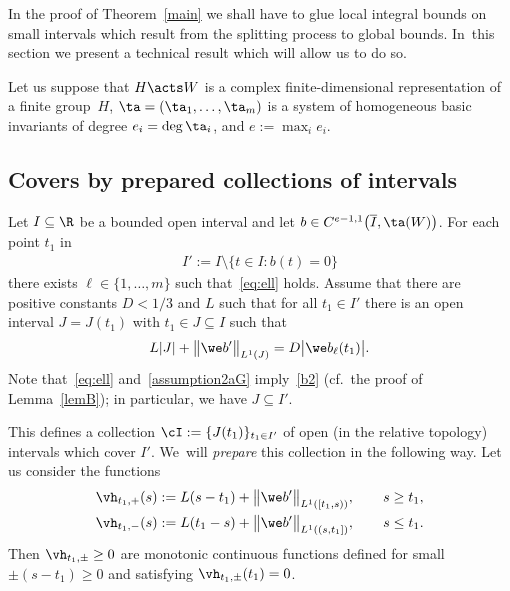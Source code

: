 In the proof of Theorem~\ref{main} we shall have to glue local integral bounds on small intervals which result from the splitting
process to global bounds. In~this section we present a technical result which will
allow us to do so.

Let us suppose that $H \acts W$ is a complex finite-dimensional representation of a finite group~$H$,
$\ta= (\ta_1,\dots, \ta_m)$ is a system of homogeneous basic invariants of degree $e_i = \deg \ta_i$, and
$e := \max_i e_i$.



\subsection{Covers by prepared collections of intervals}\label{sec:preparation}
Let $I \subseteq \R$ be a bounded open interval and
let $b \in C^{e-1,1}\big(\overline I,\ta(W)\big)$.
For each point $t_1$ in
\begin{gather*}
 I' := I \setminus \{t \in I \colon b (t) = 0\}
\end{gather*}
there exists $\ell \in \{1, \dots, m\}$ such that~\eqref{eq:ell} holds.
Assume that there are positive constants $D < 1/3$ and $L$ such that
for all $t_1 \in I'$
there is
an open interval $J=J(t_1)$ with $t_1 \in J \subseteq I$ such that
\begin{gather} \label{assumption2aG}
 L | J| + \big\|\we b'\big\|_{L^1 (J)} = D\big |\we b_\ell(t_1)\big|.
\end{gather}
Note that~\eqref{eq:ell} and~\eqref{assumption2aG} imply~\eqref{b2} (cf.\ the proof of Lemma~\ref{lemB});
in particular, we have $J \subseteq I'$.

This defines a collection $\cI:=\{J(t_1)\}_{t_1\in I'}$ of open (in the relative topology) intervals which cover $I'$. We~will \emph{prepare} this collection in the following way.
Let us consider the functions
\begin{gather*}
 \vh_{t_1,+}(s) := L (s-t_1) + \big\|\we b'\big\|_{L^1 ([t_1,s))}, \qquad s\ge t_1,
 \\
 \vh_{t_1,-}(s) := L (t_1-s) + \big\|\we b'\big\|_{L^1 ((s,t_1])}, \qquad s\le t_1.
\end{gather*}
Then $\vh_{t_1,\pm} \ge 0$ are monotonic continuous functions defined for small $\pm (s - t_1)\ge 0$
and satisfying $\vh_{t_1,\pm}(t_1) = 0$.

